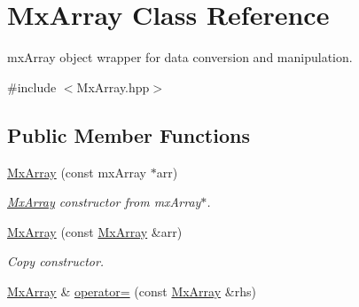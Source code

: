 \hypertarget{class_mx_array}{\section{\-Mx\-Array \-Class \-Reference}
\label{class_mx_array}
}


mx\-Array object wrapper for data conversion and manipulation.  




{\ttfamily \#include $<$\-Mx\-Array.\-hpp$>$}

\subsection*{\-Public \-Member \-Functions}
\begin{DoxyCompactItemize}
\item 
\hyperlink{class_mx_array_aae465ee9ac1f8b00442b407a9cc56e3a}{\-Mx\-Array} (const mx\-Array $\ast$arr)
\begin{DoxyCompactList}\small\item\em \hyperlink{class_mx_array}{\-Mx\-Array} constructor from mx\-Array$\ast$. \end{DoxyCompactList}\item 
\hyperlink{class_mx_array_a6f8cdf666ef945f2e26fe64fac9f2aed}{\-Mx\-Array} (const \hyperlink{class_mx_array}{\-Mx\-Array} \&arr)
\begin{DoxyCompactList}\small\item\em \-Copy constructor. \end{DoxyCompactList}\item 
\hypertarget{class_mx_array_a833f27871c0785b174e251578daeccc2}{\hyperlink{class_mx_array}{\-Mx\-Array} \& \hyperlink{class_mx_array_a833f27871c0785b174e251578daeccc2}{operator=} (const \hyperlink{class_mx_array}{\-Mx\-Array} \&rhs)}\label{class_mx_array_a833f27871c0785b174e251578daeccc2}


\end{DoxyCompactItemize}
